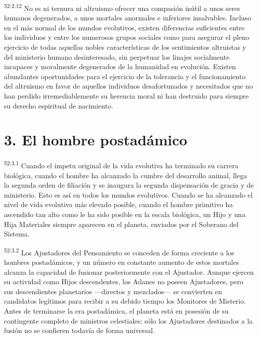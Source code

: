 \par
\textsuperscript{52:2.12} No es ni ternura ni altruismo ofrecer una compasión inútil a unos seres humanos degenerados, a unos mortales anormales e inferiores insalvables. Incluso en el más normal de los mundos evolutivos, existen diferencias suficientes entre los individuos y entre los numerosos grupos sociales como para asegurar el pleno ejercicio de todas aquellas nobles características de los sentimientos altruistas y del ministerio humano desinteresado, sin perpetuar los linajes socialmente incapaces y moralmente degenerados de la humanidad en evolución. Existen abundantes oportunidades para el ejercicio de la tolerancia y el funcionamiento del altruismo en favor de aquellos individuos desafortunados y necesitados que no han perdido irremediablemente su herencia moral ni han destruido para siempre su derecho espiritual de nacimiento.

\section*{3. El hombre postadámico}
\par
\textsuperscript{52:3.1} Cuando el ímpetu original de la vida evolutiva ha terminado su carrera biológica, cuando el hombre ha alcanzado la cumbre del desarrollo animal, llega la segunda orden de filiación y se inaugura la segunda dispensación de gracia y de ministerio. Esto es así en todos los mundos evolutivos. Cuando se ha alcanzado el nivel de vida evolutiva más elevado posible, cuando el hombre primitivo ha ascendido tan alto como le ha sido posible en la escala biológica, un Hijo y una Hija Materiales siempre aparecen en el planeta, enviados por el Soberano del Sistema.

\par
\textsuperscript{52:3.2} Los Ajustadores del Pensamiento se conceden de forma creciente a los hombres postadámicos, y un número en constante aumento de estos mortales alcanza la capacidad de fusionar posteriormente con el Ajustador. Aunque ejercen su actividad como Hijos descendentes, los Adanes no poseen Ajustadores, pero sus descendientes planetarios ---directos y mezclados--- se convierten en candidatos legítimos para recibir a su debido tiempo los Monitores de Misterio. Antes de terminarse la era postadámica, el planeta está en posesión de su contingente completo de ministros celestiales; sólo los Ajustadores destinados a la fusión no se confieren todavía de forma universal.

